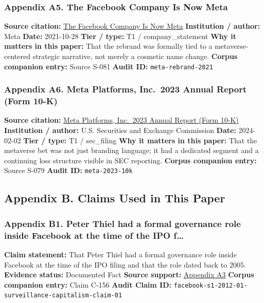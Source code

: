 \documentclass[
  american,
  11pt,
  letterpaper,
]{article}
\begin{document}
\subsubsection{Appendix A5. The Facebook Company Is Now
Meta}\label{appendix-a5-the-facebook-company-is-now-meta}

\textbf{Source citation:}
\href{https://about.fb.com/news/2021/10/facebook-company-is-now-meta/}{The
Facebook Company Is Now Meta} \textbf{Institution / author:} Meta
\textbf{Date:} 2021-10-28 \textbf{Tier / type:} T1 / company\_statement
\textbf{Why it matters in this paper:} That the rebrand was formally
tied to a metaverse-centered strategic narrative, not merely a cosmetic
name change. \textbf{Corpus companion entry:} Source S-081 \textbf{Audit
ID:} \texttt{meta-rebrand-2021}

\subsubsection{Appendix A6. Meta Platforms, Inc.~2023 Annual Report
(Form
10-K)}\label{appendix-a6-meta-platforms-inc-2023-annual-report-form-10-k}

\textbf{Source citation:}
\href{https://www.sec.gov/Archives/edgar/data/1326801/000132680124000012/meta-20231231.htm}{Meta
Platforms, Inc.~2023 Annual Report (Form 10-K)} \textbf{Institution /
author:} U.S. Securities and Exchange Commission \textbf{Date:}
2024-02-02 \textbf{Tier / type:} T1 / sec\_filing \textbf{Why it matters
in this paper:} That the metaverse bet was not just branding language;
it had a dedicated segment and a continuing loss structure visible in
SEC reporting. \textbf{Corpus companion entry:} Source S-079
\textbf{Audit ID:} \texttt{meta-2023-10k}

\subsection{Appendix B. Claims Used in This
Paper}\label{appendix-b.-claims-used-in-this-paper}

\subsubsection{Appendix B1. Peter Thiel had a formal governance role
inside Facebook at the time of the IPO
f\ldots{}}\label{appendix-b1-peter-thiel-had-a-formal-governance-role-inside-facebook-at-the-time-of-the-ipo-f}

\textbf{Claim statement:} That Peter Thiel had a formal governance role
inside Facebook at the time of the IPO filing and that the role dated
back to 2005. \textbf{Evidence status:} Documented Fact \textbf{Source
support:}
\hyperref[appendix-a3-facebook-inc-registration-statement-on-form-s-1]{Appendix
A3} \textbf{Corpus companion entry:} Claim C-156 \textbf{Audit Claim
ID:} \texttt{facebook-s1-2012-01-surveillance-capitalism-claim-01}
\end{document}
